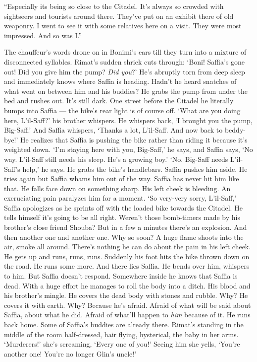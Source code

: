 \documentclass[twoside,11pt,openany]{book}
\begin{document}
``Especially its being so close to the Citadel. It's always so crowded with sightseers and tourists around
there. They've put on an exhibit there of old weaponry. I went to see it with some relatives here on a visit. They were
most impressed. And so was I.''

The chauffeur's words drone on in Bonimi's ears till they turn into a mixture of disconnected syllables. Rimat's sudden
shriek cuts through:  `Boni! Saffia's gone out! Did you give him the pump? \textit{Did you}?' He's abruptly torn
from deep sleep and immediately knows where Saffia is heading. Hadn't he heard snatches of what went on between him
and his buddies? He grabs the pump from under the bed and rushes out. It's still dark. One street before the Citadel he
literally bumps into Saffia ---  the bike's rear light is of course off. `What are you doing here, L'il-Saff?' his
brother whispers. He whispers back, `I brought you the pump, Big-Saff.' And Saffia whispers, `Thanks a lot, L'il-Saff.
And now back to beddy-bye!'  He realizes that Saffia is pushing the bike rather than riding it because it's weighted
down. `I'm staying here with you, Big-Saff,' he says, and Saffia says, `No way. L'il-Saff still needs his sleep. He's
a growing boy.'  `No. Big-Saff needs L'il-Saff's help,' he says. He grabs the bike's handlebars. Saffia pushes him
aside. He tries again but Saffia whams him out of the way. Saffia has never hit him like that. He falls face down on
something sharp. His left cheek{ }is bleeding. An excruciating pain paralyzes him for a moment. `So
very-very sorry, L'il-Saff,' Saffia apologizes as he sprints off with the loaded bike towards the Citadel. He tells
himself it's going to be all right. Weren't those bomb-timers made by his brother's close friend Shouba? But in a few a
minutes there's an explosion. And then another one and another one. Why so soon? A huge flame shoots into the air,
smoke all around. There's nothing he can do about the pain in his left cheek. He gets up and runs, runs, runs. Suddenly
his foot hits the bike thrown down on the road. He runs some more. And there lies Saffia. He bends over him, whispers
to him. But Saffia doesn't respond. Somewhere inside he knows that Saffia is dead. With a huge effort he manages to
roll the body into a ditch. His blood and his brother's mingle{. }He covers the dead body with stones
and rubble. Why? He covers it with earth. Why? Because he's afraid.  Afraid of what will be said about Saffia, about
what he did. Afraid of what'll happen to \textit{him} because of it. He runs back home. Some of Saffia's buddies are
already there. Rimat's standing in the middle of the room half-dressed, hair flying, hysterical, the baby in her arms.
`Murderers!{}' she's screaming, `Every one of you!'  Seeing him she yells, `You're another one! You're no
longer Glin's uncle!'
\end{document}
